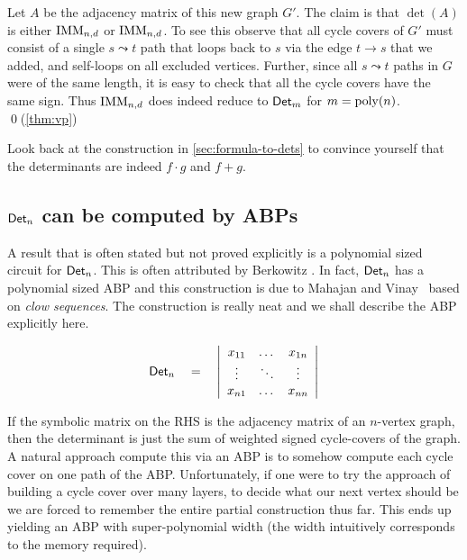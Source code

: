 Let $A$ be the adjacency matrix of this new graph $G'$. 
The claim is that $\det(A)$ is either $\operatorname{\mathrm{IMM}}_{n,d}$ or $\operatorname{\mathrm{IMM}}_{n,d}$. 
To see this observe that all cycle covers of $G'$ must consist of a single $s\leadsto t$ path that loops back to $s$ via the edge $t\rightarrow s$ that we added, and self-loops on all excluded vertices. 
Further, since all $s\leadsto t$ paths in $G$ were of the same length, it is easy to check that all the cycle covers have the same sign. 
Thus $\operatorname{\mathrm{IMM}}_{n,d}$ does indeed reduce to $\operatorname{\mathsf{Det}}_m$ for $m = \operatorname{poly}(n)$. \qed {\footnotesize (\autoref{thm:vp})}\\

\begin{exercise}
Look back at the construction in \autoref{sec:formula-to-dets} to convince yourself that the determinants are indeed $f \cdot g$ and $f + g$. 
\end{exercise}


\subsection{$\operatorname{\mathsf{Det}}_n$ can be computed by ABPs}

A result that is often stated but not proved explicitly is a polynomial sized circuit for $\operatorname{\mathsf{Det}}_n$. 
This is often attributed by Berkowitz \cite{Berk84}. 
In fact, $\operatorname{\mathsf{Det}}_n$ has a polynomial sized ABP and this construction is due to Mahajan and Vinay~\cite{mv97} based on \emph{clow sequences}. 
The construction is really neat and we shall describe the ABP explicitly here. 

\[
\operatorname{\mathsf{Det}}_n \quad = \quad \left|\begin{array}{ccc}
x_{11} & \dots & x_{1n}\\
\vdots & \ddots & \vdots \\
x_{n1} & \dots & x_{nn}
\end{array}
\right|\]

If the symbolic matrix on the RHS is the adjacency matrix of an $n$-vertex graph, then the determinant is just the sum of weighted signed cycle-covers of the graph. 
A natural approach compute this via an ABP is to somehow compute each cycle cover on one path of the ABP. 
Unfortunately, if one were to try the \naive approach of building a cycle cover over many layers, to decide what our next vertex should be we are forced to remember the entire partial construction thus far. 
This ends up yielding an ABP with super-polynomial width (the width intuitively corresponds to the memory required). 

